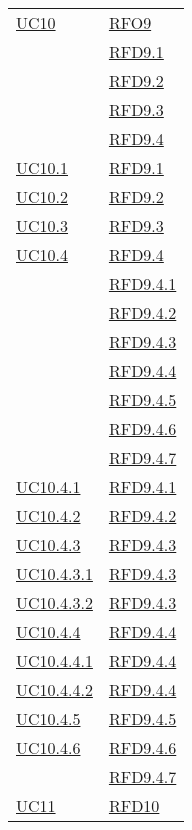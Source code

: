 \begin{longtable}{|>{\centering}m{5cm}|m{5cm}<{\centering}|}
\hyperref[UC10]{UC10} & \hyperlink{RFO9}{RFO9}\\
& \hyperlink{RFD9.1}{RFD9.1}\\
& \hyperlink{RFD9.2}{RFD9.2}\\
& \hyperlink{RFD9.3}{RFD9.3}\\
& \hyperlink{RFD9.4}{RFD9.4}\\ \hline
\hyperref[UC10.1]{UC10.1} & \hyperlink{RFD9.1}{RFD9.1}\\ \hline
\hyperref[UC10.2]{UC10.2} & \hyperlink{RFD9.2}{RFD9.2}\\ \hline
\hyperref[UC10.3]{UC10.3} & \hyperlink{RFD9.3}{RFD9.3}\\ \hline
\hyperref[UC10.4]{UC10.4} & \hyperlink{RFD9.4}{RFD9.4}\\
& \hyperlink{RFD9.4.1}{RFD9.4.1}\\
& \hyperlink{RFD9.4.2}{RFD9.4.2}\\
& \hyperlink{RFD9.4.3}{RFD9.4.3}\\
& \hyperlink{RFD9.4.4}{RFD9.4.4}\\
& \hyperlink{RFD9.4.5}{RFD9.4.5}\\
& \hyperlink{RFD9.4.6}{RFD9.4.6}\\
& \hyperlink{RFD9.4.7}{RFD9.4.7}\\ \hline
\hyperref[UC10.4.1]{UC10.4.1} & \hyperlink{RFD9.4.1}{RFD9.4.1}\\ \hline
\hyperref[UC10.4.2]{UC10.4.2} & \hyperlink{RFD9.4.2}{RFD9.4.2}\\ \hline
\hyperref[UC10.4.3]{UC10.4.3} & \hyperlink{RFD9.4.3}{RFD9.4.3}\\ \hline
\hyperref[UC10.4.3.1]{UC10.4.3.1} & \hyperlink{RFD9.4.3}{RFD9.4.3}\\ \hline
\hyperref[UC10.4.3.2]{UC10.4.3.2} & \hyperlink{RFD9.4.3}{RFD9.4.3}\\ \hline
\hyperref[UC10.4.4]{UC10.4.4} & \hyperlink{RFD9.4.4}{RFD9.4.4}\\ \hline
\hyperref[UC10.4.4.1]{UC10.4.4.1} & \hyperlink{RFD9.4.4}{RFD9.4.4}\\ \hline
\hyperref[UC10.4.4.2]{UC10.4.4.2} & \hyperlink{RFD9.4.4}{RFD9.4.4}\\ \hline
\hyperref[UC10.4.5]{UC10.4.5} & \hyperlink{RFD9.4.5}{RFD9.4.5}\\ \hline
\hyperref[UC10.4.6]{UC10.4.6} & \hyperlink{RFD9.4.6}{RFD9.4.6}\\
& \hyperlink{RFD9.4.7}{RFD9.4.7}\\ \hline
\hyperref[UC11]{UC11} & \hyperlink{RFD10}{RFD10}\\

\end{longtable}
